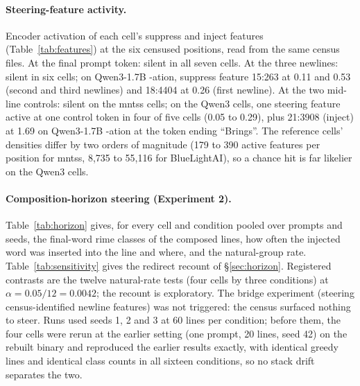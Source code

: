 \documentclass[11pt]{article}
\begin{document}
\paragraph{Steering-feature activity.}
Encoder activation of each cell's suppress and inject features (Table~\ref{tab:features}) at the six censused positions, read from the same census files. At the final prompt token: silent in all seven cells. At the three newlines: silent in six cells; on Qwen3-1.7B -ation, suppress feature 15:263 at 0.11 and 0.53 (second and third newlines) and 18:4404 at 0.26 (first newline). At the two mid-line controls: silent on the mntss cells; on the Qwen3 cells, one steering feature active at one control token in four of five cells (0.05 to 0.29), plus 21:3908 (inject) at 1.69 on Qwen3-1.7B -ation at the token ending ``Brings''. The reference cells' densities differ by two orders of magnitude (179 to 390 active features per position for mntss, 8{,}735 to 55{,}116 for BlueLightAI), so a chance hit is far likelier on the Qwen3 cells.

\paragraph{Composition-horizon steering (Experiment 2).}
Table~\ref{tab:horizon} gives, for every cell and condition pooled over prompts and seeds, the final-word rime classes of the composed lines, how often the injected word was inserted into the line and where, and the natural-group rate. Table~\ref{tab:sensitivity} gives the redirect recount of \S\ref{sec:horizon}. Registered contrasts are the twelve natural-rate tests (four cells by three conditions) at $\alpha = 0.05/12 = 0.0042$; the recount is exploratory. The bridge experiment (steering census-identified newline features) was not triggered: the census surfaced nothing to steer. Runs used seeds 1, 2 and 3 at 60 lines per condition; before them, the four cells were rerun at the earlier setting (one prompt, 20 lines, seed 42) on the rebuilt binary and reproduced the earlier results exactly, with identical greedy lines and identical class counts in all sixteen conditions, so no stack drift separates the two.
\end{document}

